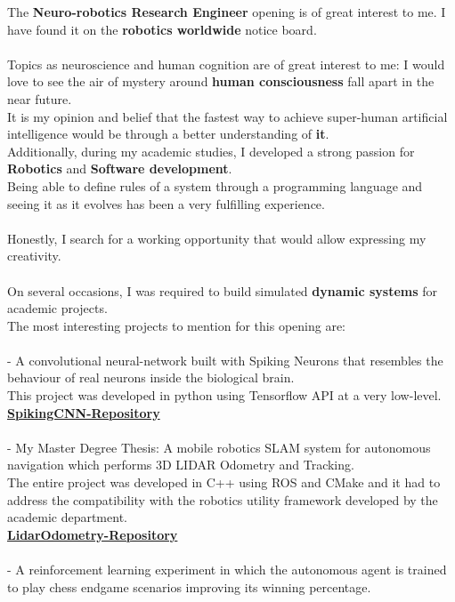 \documentclass[9pt]{developercv} %
\begin{document}
The \textbf{ Neuro-robotics Research Engineer } opening is of great interest to me. I have found it on the \textbf{robotics worldwide} notice board.\\
\\
Topics as neuroscience and human cognition are of great interest to me: I would love to see the air of mystery around \textbf{human consciousness} fall apart in the near future.\\
It is my opinion and belief that the fastest way to achieve super-human artificial intelligence would be through a better understanding of \textbf{it}.\\
Additionally, during my academic studies, I developed a strong passion for \textbf{Robotics} and \textbf{Software development}.\\
Being able to define rules of a system through a programming language and seeing it as it evolves has been a very fulfilling experience.\\
\\
Honestly, I search for a working opportunity that would allow expressing my creativity.\\
\\
On several occasions, I was required to build simulated \textbf{dynamic systems} for academic projects.\\
The most interesting projects to mention for this opening are:\\
\\
- A convolutional neural-network built with Spiking Neurons that resembles the behaviour of real neurons inside the biological brain.\\
This project was developed in python using Tensorflow API at a very low-level.\\
\href{https://github.com/dinies/SpikingCNN}{\textbf{SpikingCNN-Repository}}\\
\\
- My Master Degree Thesis:  A mobile robotics SLAM system for autonomous navigation which performs 3D LIDAR Odometry and Tracking.\\
The entire project was developed in C++ using ROS and CMake and it had to address the compatibility with the robotics utility framework developed by the academic department.\\
\href{https://github.com/dinies/3D-Lidar-Odometry-and-Tracking}{\textbf{LidarOdometry-Repository}}\\
\\
- A reinforcement learning experiment in which the autonomous agent is trained to play chess endgame scenarios improving its winning percentage.\\
\end{document}
